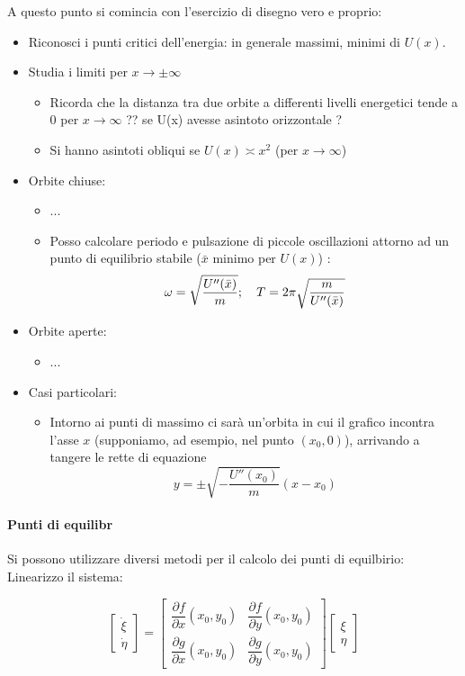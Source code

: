 \documentclass[a4paper,12pt]{article}
\begin{document}
A questo punto si comincia con l'esercizio di disegno vero e proprio:
\begin{itemize}
 \item Riconosci i punti critici dell'energia: in generale massimi, minimi di $U(x)$.
 \item Studia i limiti per $x\to\pm\infty$
 \begin{itemize}
  \item Ricorda che la distanza tra due orbite a differenti livelli energetici tende a $0$ per $x\to\infty$ {?? se U(x) avesse asintoto orizzontale ? } 
  \item Si hanno asintoti obliqui se $U(x)\asymp x^2$ (per $x\to\infty$)
 \end{itemize}

 \item Orbite chiuse:
 \begin{itemize}
  \item ...
  \item Posso calcolare periodo e pulsazione di piccole oscillazioni attorno ad un punto di equilibrio stabile ($\bar{x}$ minimo per $U(x)$) : $$\omega = \sqrt{U''(\bar{x})\over m};\ \ \ T = 2\pi\sqrt{m \over U''(\bar{x})}$$
 \end{itemize}
 \item Orbite aperte:
 \begin{itemize}
  \item ...
 \end{itemize}
 \item Casi particolari:
 \begin{itemize}
   \item Intorno ai punti di massimo ci sarà un'orbita in cui il grafico incontra l'asse $x$ (supponiamo, ad esempio, nel punto $(x_0, 0)$), arrivando a tangere le rette di equazione $$y = \pm\sqrt{-\dfrac{U''(x_0)}{m}}(x-x_0)$$
 \end{itemize}
\end{itemize}

\paragraph{Punti di equilibr}
Si possono utilizzare diversi metodi per il calcolo dei punti di equilbirio:
Linearizzo il sistema:

$$
\begin{bmatrix}
 \dot{\xi} \\ \dot{\eta}
\end{bmatrix}
= 
\begin{bmatrix}
 \dfrac{\partial f}{\partial x} (x_0, y_0) & \dfrac{\partial f}{\partial y} (x_0, y_0) \\
 \dfrac{\partial g}{\partial x} (x_0, y_0) & \dfrac{\partial g}{\partial y} (x_0, y_0)
\end{bmatrix}
\begin{bmatrix}
 \xi \\ \eta
\end{bmatrix}
$$
\end{document}
